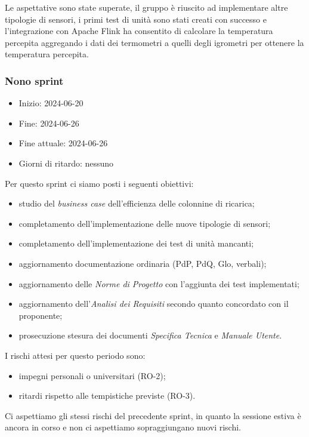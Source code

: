 Le aspettative sono state superate, il gruppo è riuscito ad implementare altre tipologie di sensori, i primi test di unità sono stati creati con successo e l'integrazione con Apache Flink ha consentito di calcolare la temperatura percepita aggregando i dati dei termometri a quelli degli igrometri per ottenere la temperatura percepita. 



\newpage
\subsubsection{Nono sprint}
\begin{itemize}
	\item Inizio: 2024-06-20
	\item Fine: 2024-06-26
	\item Fine attuale: 2024-06-26
	\item Giorni di ritardo: nessuno
\end{itemize}

Per questo sprint ci siamo posti i seguenti obiettivi:
\begin{itemize}
	\item studio del \textit{business case} dell'efficienza delle colonnine di ricarica;
	\item completamento dell'implementazione delle nuove tipologie di sensori;
	\item completamento dell'implementazione dei test di unità mancanti;
	\item aggiornamento documentazione ordinaria (PdP, PdQ, Glo, verbali);
	\item aggiornamento delle \textit{Norme di Progetto} con l'aggiunta dei test implementati;
	\item aggiornamento dell'\textit{Analisi dei Requisiti} secondo quanto concordato con il proponente;
	\item prosecuzione stesura dei documenti \textit{Specifica Tecnica} e \textit{Manuale Utente}.
\end{itemize}

I rischi attesi per questo periodo sono:
\begin{itemize}
	\item impegni personali o universitari (RO-2);
	\item ritardi rispetto alle tempistiche previste (RO-3).
\end{itemize}
Ci aspettiamo gli stessi rischi del precedente sprint, in quanto la sessione estiva è ancora in corso e non ci aspettiamo sopraggiungano nuovi rischi.

